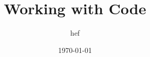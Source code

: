 \documentclass{beamer}
\title{Working with Code}
\author{hef}
\date{\today}
\begin{document}
\frame{\titlepage}
\section[outline]{}
\frame{\tableofcontents}
\end{document}
